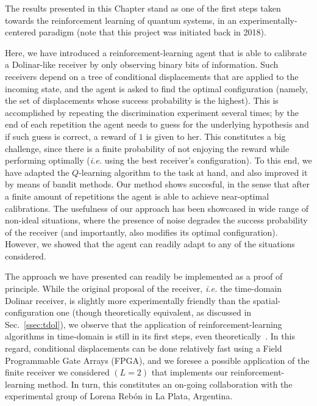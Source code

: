 The results presented in this Chapter stand as one of the first steps taken towards the reinforcement learning of quantum systems, in an experimentally-centered paradigm (note that this project was initiated back in 2018).

Here, we have introduced a reinforcement-learning agent that is able to calibrate a Dolinar-like receiver by only observing binary bits of information. Such receivers depend on a tree of conditional displacements that are applied to the incoming state, and the agent is asked to find the optimal configuration (namely, the set of displacements whose success probability is the highest). This is accomplished by repeating the discrimination experiment several times; by the end of each repetition the agent needs to guess for the underlying hypothesis and if such guess is correct, a reward of $1$ is given to her. This constitutes a big challenge, since there is a finite probability of not enjoying the reward while performing optimally (\textit{i.e.} using the best receiver's configuration). To this end, we have adapted the $Q$-learning algorithm to the task at hand, and also improved it by means of bandit methods. Our method shows succesful, in the sense that after a finite amount of repetitions the agent is able to achieve near-optimal calibrations. The usefulness of our approach has been showcased in wide range of non-ideal situations, where the presence of noise degrades the success probability of the receiver (and importantly, also modifies its optimal configuration). However, we showed that the agent can readily adapt to any of the situations considered.

The approach we have presented can readily be implemented as a proof of principle. While the original proposal of the receiver, \textit{i.e.} the time-domain Dolinar receiver, is slightly more experimentally friendly than the spatial-configuration one (though theoretically equivalent, as discussed in Sec.~\ref{ssec:tdol}), we observe that the application of reinforcement-learning algorithms in time-domain is still in its first steps, even theoretically~\cite{doya,cagata}. In this regard, conditional displacements can be done relatively fast using a Field Programmable Gate Arrays (FPGA), and we foresee a possible application of the finite receiver we considered $(L=2)$ that implements our reinforcement-learning method. In turn, this constitutes an on-going collaboration with the experimental group of Lorena Rebón in La Plata, Argentina.

